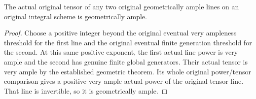 \begin{theorem}
\label{thm:fc-original-ample-tensor-ample}
\leanok
{}
The actual original tensor of any two original geometrically ample
lines on an original integral scheme is geometrically ample.
\end{theorem}
\begin{proof}
Choose a positive integer beyond the original eventual very ampleness
threshold for the first line and the original eventual finite generation
threshold for the second. At this same positive exponent, the first
actual line power is very ample and the second has genuine finite
global generators. Their actual tensor is very ample by the established
geometric theorem. Its whole original power/tensor comparison gives a
positive very ample actual power of the original tensor line. That line
is invertible, so it is geometrically ample.
\end{proof}
